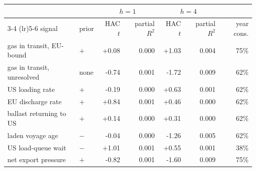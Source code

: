 \begin{tabular}{llrrrrr}
\toprule
 & & \multicolumn{2}{c}{$h=1$} & \multicolumn{2}{c}{$h=4$} & \\
\cmidrule(lr){3-4} \cmidrule(lr){5-6}
signal & prior & HAC $t$ & partial $R^2$ & HAC $t$ & partial $R^2$ & year cons. \\
\midrule
  gas in transit, EU-bound & $+$ & +0.08 & 0.000 & +1.03 & 0.004 & 75\% \\
  gas in transit, unresolved & none & -0.74 & 0.001 & -1.72 & 0.009 & 62\% \\
  US loading rate & $+$ & -0.19 & 0.000 & +0.63 & 0.001 & 62\% \\
  EU discharge rate & $+$ & +0.84 & 0.001 & +0.46 & 0.000 & 62\% \\
  ballast returning to US & $+$ & +0.14 & 0.000 & +0.31 & 0.000 & 62\% \\
  laden voyage age & $-$ & -0.04 & 0.000 & -1.26 & 0.005 & 62\% \\
  US load-queue wait & $-$ & +1.01 & 0.001 & +0.55 & 0.001 & 38\% \\
  net export pressure & $+$ & -0.82 & 0.001 & -1.60 & 0.009 & 75\% \\
\bottomrule
\end{tabular}
